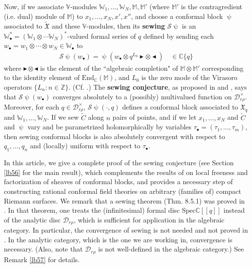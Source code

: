\documentclass[12pt,a4paper,notitlepage]{article}
\theoremstyle{definition}
\theoremstyle{plain}
\newcommand{\fk}{\mathfrak}
\newcommand{\mc}{\mathcal}
\newcommand{\wtd}{\widetilde}
\newcommand{\End}{\mathrm{End}} %
\newcommand{\mbb}{\mathbb}
\newcommand{\blt}{\bullet}
\newcommand{\Vbb}{\mathbb V}
\newcommand{\Wbb}{\mathbb W}
\newcommand{\Mbb}{\mathbb M}
\newcommand{\Cbb}{\mathbb C}
\newcommand{\Zbb}{\mathbb Z}
\newcommand{\btl}{\blacktriangleleft}
\newcommand{\btr}{\blacktriangleright}
\numberwithin{equation}{section}
\begin{document}
Now, if we associate $\Vbb$-modules $\Wbb_1,\dots,\Wbb_N,\Mbb,\Mbb'$ (where $\Mbb'$ is the contragredient (i.e. dual) module of $\Mbb$) to $x_1,\dots,x_N,x',x''$, and choose a conformal block $\uppsi$ associated to $\wtd{\fk X}$ and these $\Vbb$-modules, then its \textbf{sewing} $\mc S\uppsi$ is an $\Wbb_\blt^*=(\Wbb_1\otimes\cdots\Wbb_N)^*$-valued formal series of $q$ defined by sending each $w_\blt=w_1\otimes\cdots\otimes w_N\in\Wbb_\blt$ to
\begin{align*}
\mc S\uppsi(w_\blt)=\uppsi(w_\blt\otimes q^{L_0}\btr\otimes\btl)\quad\in\Cbb\{q\}
\end{align*}
where $\btr\otimes\btl$ is the element of the ``algebraic completion" of $\Mbb\otimes\Mbb'$ corresponding to the identity element of $\End_\Cbb(\Mbb)$, and $L_0$ is the zero mode of the Virasoro operators $\{L_n:n\in\Zbb\}$. (Cf. \cite{Seg88,Vafa87,TUY89,Hua97,DGT19b}.) The \textbf{sewing conjecture}, as proposed in \cite[Conj. 8.1]{Zhu94} and \cite[Problem 2.2]{Hua16}, says that $\mc S\uppsi(w_\blt)$ converges absolutely to a (possibly) multivalued function on $\mc D_{r\rho}^\times$. Moreover, for each $q\in\mc D_{r\rho}^\times$, $\mc S\uppsi(\cdot,q)$ defines a conformal block associated to $\fk X_q$ and $\Wbb_1,\dots,\Wbb_N$. If we sew $\wtd C$ along $n$ pairs of points, and if we let  $x_1,\dots,x_N$ and  $\wtd C$ and $\uppsi$    vary and be parametrized holomorphically by variables $\tau_\blt=(\tau_1,\dots,\tau_m)$, then  sewing  conformal blocks is also absolutely  convergent with respect to $q_1,\dots,q_n$ and (locally) uniform with respect to $\tau_\blt$. 

In this article, we give a complete proof of the sewing conjecture (see Section \ref{lb56} for the main result), which complements the results of \cite{DGT19b} on local freeness and factorization of sheaves of conformal blocks, and provides a necessary step of constructing rational conformal field theories on arbitrary (families of) compact Riemann surfaces. We remark that a sewing theorem (Thm. 8.5.1) was proved in \cite{DGT19b}. In that theorem, one treats the (infinitesimal) formal disc $\mathrm{Spec}\mbb C[[q]]$ instead of the analytic disc $\mc D_{r\rho}$, which is sufficient for application  in the algebraic category.  In particular, the convergence of sewing is not needed and not proved in \cite{DGT19b}. In the analytic category, which is the one we are working in, convergence is necessary. (Also, note  that $\mc D_{r\rho}$ is not well-defined in the algebraic category.) See Remark \ref{lb57} for details.
\end{document}
